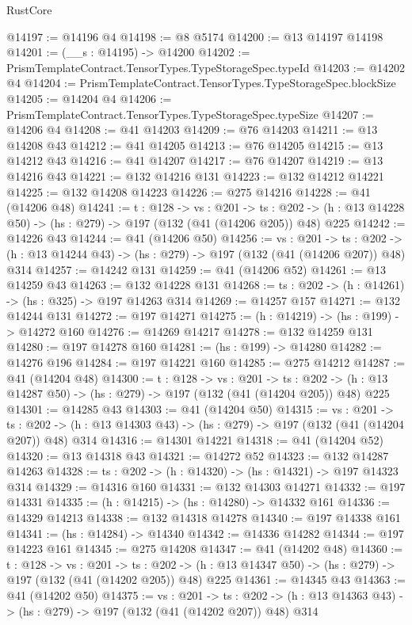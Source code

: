 \begin{lexlean}{RustCore}
\begin{coremodule}
@14197 := @14196 @4
@14198 := @8 @5174
@14200 := @13 @14197 @14198
@14201 := (__s : @14195) -> @14200
@14202 := PrismTemplateContract.TensorTypes.TypeStorageSpec.typeId
@14203 := @14202 @4
@14204 := PrismTemplateContract.TensorTypes.TypeStorageSpec.blockSize
@14205 := @14204 @4
@14206 := PrismTemplateContract.TensorTypes.TypeStorageSpec.typeSize
@14207 := @14206 @4
@14208 := @41 @14203
@14209 := @76 @14203
@14211 := @13 @14208 @43
@14212 := @41 @14205
@14213 := @76 @14205
@14215 := @13 @14212 @43
@14216 := @41 @14207
@14217 := @76 @14207
@14219 := @13 @14216 @43
@14221 := @132 @14216 @131
@14223 := @132 @14212 @14221
@14225 := @132 @14208 @14223
@14226 := @275 @14216
@14228 := @41 (@14206 @48)
@14241 := {t : @128} ->
  {vs : @201} ->
  {ts : @202} -> (h : @13 @14228 @50) -> (hs : @279) -> @197 (@132 (@41 (@14206 @205)) @48) @225
@14242 := @14226 @43
@14244 := @41 (@14206 @50)
@14256 := {vs : @201} ->
  {ts : @202} -> (h : @13 @14244 @43) -> (hs : @279) -> @197 (@132 (@41 (@14206 @207)) @48) @314
@14257 := @14242 @131
@14259 := @41 (@14206 @52)
@14261 := @13 @14259 @43
@14263 := @132 @14228 @131
@14268 := {ts : @202} -> (h : @14261) -> (hs : @325) -> @197 @14263 @314
@14269 := @14257 @157
@14271 := @132 @14244 @131
@14272 := @197 @14271
@14275 := (h : @14219) -> (hs : @199) -> @14272 @160
@14276 := @14269 @14217
@14278 := @132 @14259 @131
@14280 := @197 @14278 @160
@14281 := (hs : @199) -> @14280
@14282 := @14276 @196
@14284 := @197 @14221 @160
@14285 := @275 @14212
@14287 := @41 (@14204 @48)
@14300 := {t : @128} ->
  {vs : @201} ->
  {ts : @202} -> (h : @13 @14287 @50) -> (hs : @279) -> @197 (@132 (@41 (@14204 @205)) @48) @225
@14301 := @14285 @43
@14303 := @41 (@14204 @50)
@14315 := {vs : @201} ->
  {ts : @202} -> (h : @13 @14303 @43) -> (hs : @279) -> @197 (@132 (@41 (@14204 @207)) @48) @314
@14316 := @14301 @14221
@14318 := @41 (@14204 @52)
@14320 := @13 @14318 @43
@14321 := @14272 @52
@14323 := @132 @14287 @14263
@14328 := {ts : @202} -> (h : @14320) -> (hs : @14321) -> @197 @14323 @314
@14329 := @14316 @160
@14331 := @132 @14303 @14271
@14332 := @197 @14331
@14335 := (h : @14215) -> (hs : @14280) -> @14332 @161
@14336 := @14329 @14213
@14338 := @132 @14318 @14278
@14340 := @197 @14338 @161
@14341 := (hs : @14284) -> @14340
@14342 := @14336 @14282
@14344 := @197 @14223 @161
@14345 := @275 @14208
@14347 := @41 (@14202 @48)
@14360 := {t : @128} ->
  {vs : @201} ->
  {ts : @202} -> (h : @13 @14347 @50) -> (hs : @279) -> @197 (@132 (@41 (@14202 @205)) @48) @225
@14361 := @14345 @43
@14363 := @41 (@14202 @50)
@14375 := {vs : @201} ->
  {ts : @202} -> (h : @13 @14363 @43) -> (hs : @279) -> @197 (@132 (@41 (@14202 @207)) @48) @314

\end{coremodule}
\end{lexlean}
